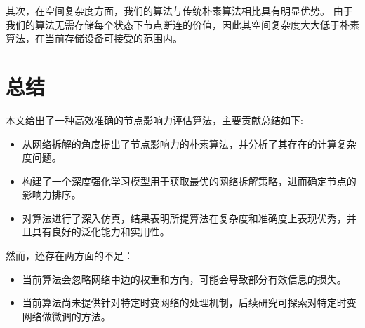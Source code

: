 \documentclass[twocolumn]{morningstar}
\begin{document}
其次，在空间复杂度方面，我们的算法与传统朴素算法相比具有明显优势。
由于我们的算法无需存储每个状态下节点断连的价值，因此其空间复杂度大大低于朴素算法，在当前存储设备可接受的范围内。


\section{总结}\label{sec:Conclusion}

本文给出了一种高效准确的节点影响力评估算法，主要贡献总结如下:

\begin{itemize}
    \item 从网络拆解的角度提出了节点影响力的朴素算法，并分析了其存在的计算复杂度问题。
    \item 构建了一个深度强化学习模型用于获取最优的网络拆解策略，进而确定节点的影响力排序。
    \item 对算法进行了深入仿真，结果表明所提算法在复杂度和准确度上表现优秀，并且具有良好的泛化能力和实用性。
\end{itemize}

然而，还存在两方面的不足：

\begin{itemize}
    \item 当前算法会忽略网络中边的权重和方向，可能会导致部分有效信息的损失。
    \item 当前算法尚未提供针对特定时变网络的处理机制，后续研究可探索对特定时变网络做微调的方法。
\end{itemize}

\end{document}
